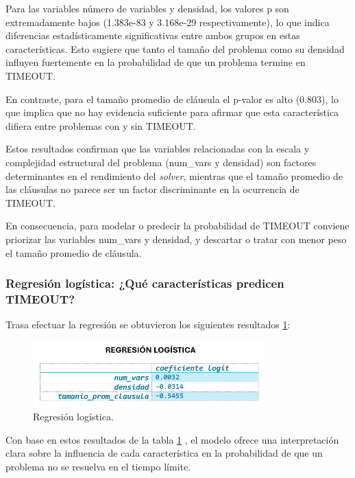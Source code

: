 Para las variables n\'umero de variables y densidad, los valores p son extremadamente bajos (1.383e-83 y 3.168e-29 respectivamente), lo que indica diferencias estadísticamente significativas entre ambos grupos en estas características. Esto sugiere que tanto el tamaño del problema como su densidad influyen fuertemente en la probabilidad de que un problema termine en TIMEOUT.

En contraste, para el tamaño promedio de cláusula el p-valor es alto (0.803), lo que implica que no hay evidencia suficiente para afirmar que esta característica difiera entre problemas con y sin TIMEOUT.

Estos resultados confirman que las variables relacionadas con la escala y complejidad estructural del problema (num\_vars y densidad) son factores determinantes en el rendimiento del \textit{solver}, mientras que el tamaño promedio de las cl\'ausulas no parece ser un factor discriminante en la ocurrencia de TIMEOUT.

En consecuencia, para modelar o predecir la probabilidad de TIMEOUT conviene priorizar las variables num\_vars y densidad, y descartar o tratar con menor peso el tamaño promedio de cláusula.

\subsubsection{Regresi\'on log\'istica: ¿Qué caracter\'isticas predicen TIMEOUT?}

Trasa efectuar la regresi\'on se obtuvieron los siguientes resultados \ref{fig:regresion-logistica}:

\begin{figure}[ht]
    \centering
    \includegraphics[width=0.8\textwidth]{Graphics/regresion_logistica.png}
    \caption{Regresi\'on log\'istica.}
    \label{fig:regresion-logistica}
\end{figure}

Con base en estos resultados de la tabla \ref{fig:regresion-logistica} , el modelo ofrece una interpretación clara sobre la influencia de cada característica en la probabilidad de que un problema no se resuelva en el tiempo límite.


